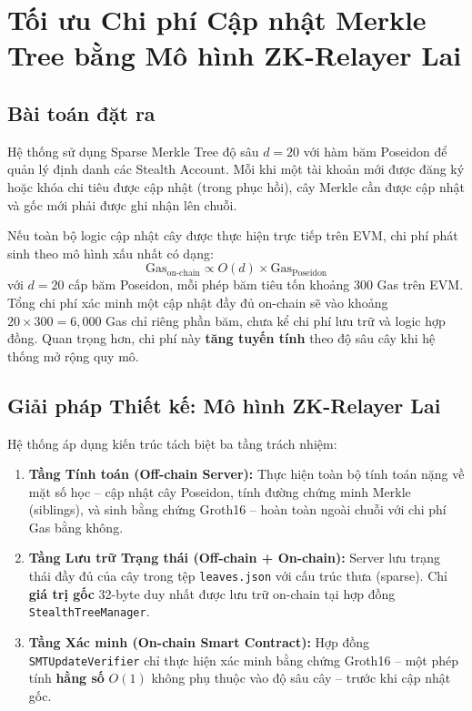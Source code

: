 \documentclass[../DoAn.tex]{subfiles}
\begin{document}
\section{Tối ưu Chi phí Cập nhật Merkle Tree bằng Mô hình ZK-Relayer Lai}
\label{sec:merkle_hybrid}

\subsection{Bài toán đặt ra}
\label{subsec:merkle_problem}

Hệ thống sử dụng Sparse Merkle Tree độ sâu $d = 20$ với hàm băm Poseidon để quản lý định danh các Stealth Account. Mỗi khi một tài khoản mới được đăng ký hoặc khóa chi tiêu được cập nhật (trong phục hồi), cây Merkle cần được cập nhật và gốc mới phải được ghi nhận lên chuỗi.

Nếu toàn bộ logic cập nhật cây được thực hiện trực tiếp trên EVM, chi phí phát sinh theo mô hình xấu nhất có dạng:
\[
    \text{Gas}_{\text{on-chain}} \propto O(d) \times \text{Gas}_{\text{Poseidon}}
\]
với $d = 20$ cấp băm Poseidon, mỗi phép băm tiêu tốn khoảng 300 Gas trên EVM. Tổng chi phí xác minh một cập nhật đầy đủ on-chain sẽ vào khoảng $20 \times 300 = 6{,}000$ Gas chỉ riêng phần băm, chưa kể chi phí lưu trữ và logic hợp đồng. Quan trọng hơn, chi phí này \textbf{tăng tuyến tính} theo độ sâu cây khi hệ thống mở rộng quy mô.

\subsection{Giải pháp Thiết kế: Mô hình ZK-Relayer Lai}
\label{subsec:merkle_solution}

Hệ thống áp dụng kiến trúc tách biệt ba tầng trách nhiệm:

\begin{enumerate}
    \item \textbf{Tầng Tính toán (Off-chain Server):} Thực hiện toàn bộ tính toán nặng về mặt số học -- cập nhật cây Poseidon, tính đường chứng minh Merkle (siblings), và sinh bằng chứng Groth16 -- hoàn toàn ngoài chuỗi với chi phí Gas bằng không.

    \item \textbf{Tầng Lưu trữ Trạng thái (Off-chain + On-chain):} Server lưu trạng thái đầy đủ của cây trong tệp \texttt{leaves.json} với cấu trúc thưa (sparse). Chỉ \textbf{giá trị gốc} 32-byte duy nhất được lưu trữ on-chain tại hợp đồng \texttt{StealthTreeManager}.

    \item \textbf{Tầng Xác minh (On-chain Smart Contract):} Hợp đồng \texttt{SMTUpdateVerifier} chỉ thực hiện xác minh bằng chứng Groth16 -- một phép tính \textbf{hằng số} $O(1)$ không phụ thuộc vào độ sâu cây -- trước khi cập nhật gốc.
\end{enumerate}
\end{document}
